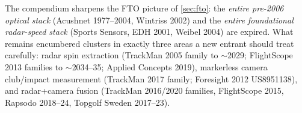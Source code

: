 \begin{implication}
The compendium sharpens the FTO picture of \cref{sec:fto}: the
\emph{entire pre-2006 optical stack} (Acushnet 1977--2004, Wintriss
2002) and the \emph{entire foundational radar-speed stack} (Sports
Sensors, EDH 2001, Weibel 2004) are expired. What remains encumbered
clusters in exactly three areas a new entrant should treat carefully:
radar spin extraction (TrackMan 2005 family to $\sim$2029; FlightScope
2013 families to $\sim$2034--35; Applied Concepts 2019), markerless
camera club/impact measurement (TrackMan 2017 family; Foresight 2012
US8951138), and radar+camera fusion (TrackMan 2016/2020 families,
FlightScope 2015, Rapsodo 2018--24, Topgolf Sweden 2017--23).
\end{implication}
